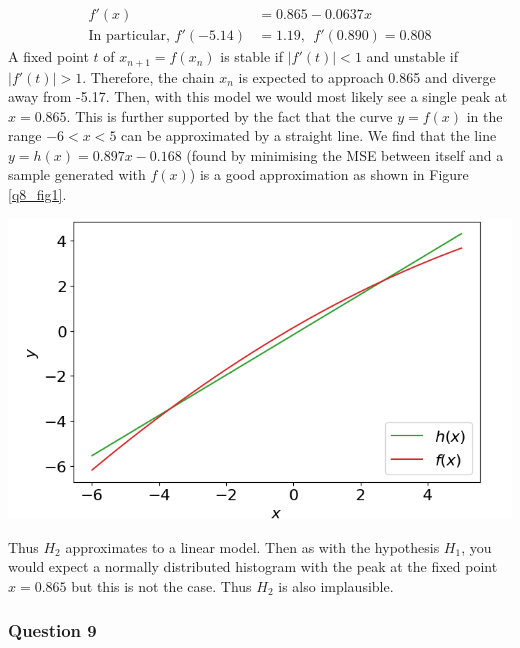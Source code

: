 \documentclass[12pt, a4paper]{article}
\begin{document}
\begin{align*}
	f'(x) & = 0.865 - 0.0637x \\
	\text{In particular, } f'(-5.14) & = 1.19, ~~ f'(0.890) = 0.808
\end{align*}
A fixed point $t$ of $x_{n+1}=f(x_{n})$ is stable if $|f'(t)|<1$ and unstable if $|f'(t)|>1$. Therefore, the chain $x_n$ is expected to approach 0.865 and diverge away from -5.17. Then, with this model we would most likely see a single peak at $x=0.865$. This is further supported by the fact that the curve $y=f(x)$ in the range $-6<x<5$ can be approximated by a straight line. We find that the line $y=h(x)=0.897x-0.168$ (found by minimising the MSE between itself and a sample generated with $f(x)$) is a good approximation as shown in Figure \ref{q8_fig1}. \\
\begin{minipage}{\textwidth}
	\centering
	\includegraphics[width = 0.65\linewidth]{q8_fig1}
	\label{q8_fig1}
\end{minipage}
\vspace{0.2cm}

Thus $H_{2}$ approximates to a linear model. Then as with the hypothesis $H_{1}$, you would expect a normally distributed histogram with the peak at the fixed point $x=0.865$ but this is not the case. Thus $H_{2}$ is also implausible.

\subsubsection*{Question 9}
\end{document}
